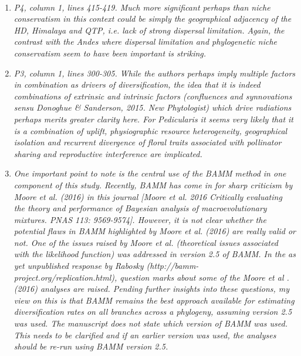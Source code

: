 \documentclass[12pt]{letter}
\begin{document}
\begin{letter}{ \\

}
\begin{enumerate}
\item \textit{P4, column 1, lines 415-419. Much more significant
    perhaps than niche conservatism in this context could be simply
    the geographical adjacency of the HD, Himalaya and QTP, i.e. lack
    of strong dispersal limitation. Again, the contrast with the Andes
    where dispersal limitation and phylogenetic niche conservatism
    seem to have been important is striking.}

\item \textit{P3, column 1, lines 300-305. While the authors perhaps
    imply multiple factors in combination as drivers of
    diversification, the idea that it is indeed combinations of
    extrinsic and intrinsic factors (confluences and synnovations
    sensu Donoghue \& Sanderson, 2015. New Phytologist) which drive
    radiations perhaps merits greater clarity here. For Pedicularis it
    seems very likely that it is a combination of uplift,
    physiographic resource heterogeneity, geographical isolation and
    recurrent divergence of floral traits associated with pollinator
    sharing and reproductive interference are implicated.}

\item \textit{One important point to note is the central use of the
    BAMM method in one component of this study. Recently, BAMM has
    come in for sharp criticism by Moore et al. (2016) in this journal
    [Moore et al. 2016 Critically evaluating the theory and
    performance of Bayesian analysis of macroevolutionary
    mixtures. PNAS 113: 9569-9574]. However, it is not clear whether
    the potential flaws in BAMM highlighted by Moore et al. (2016) are
    really valid or not. One of the issues raised by Moore et
    al. (theoretical issues associated with the likelihood function)
    was addressed in version 2.5 of BAMM.  In the as yet unpublished
    response by Rabosky (http://bamm-project.org/replication.html),
    question marks about some of the Moore et al .(2016) analyses are
    raised.  Pending further insights into these questions, my view on
    this is that BAMM remains the best approach available for
    estimating diversification rates on all branches across a
    phylogeny, assuming version 2.5 was used. The manuscript does not
    state which version of BAMM was used. This needs to be clarified
    and if an earlier version was used, the analyses should be re-run
    using BAMM version 2.5.}


\end{enumerate}
\end{letter}
\end{document}
